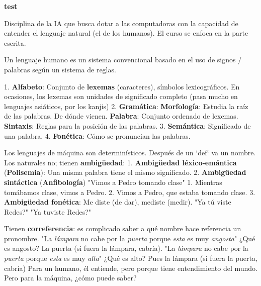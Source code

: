 \documentclass{fmbnotes}
\begin{document}
\newcommand*{\titulo}{test}
\portada{\titulo} 

\begin{center}
    {\Large\bfseries\sffamily \titulo}
\end{center}

Disciplina de la IA que busca dotar a las computadoras con la capacidad de entender el lenguaje natural (el de los humanos).
El curso se enfoca en la parte escrita.

\label{sec:introduccion_al_procesamiento_de_lenguaje_natural}

\label{sec:que_es_un_lenguaje_natural_}

Un lenguaje humano es un sistema convencional basado en el uso de signos / palabras según un sistema de reglas. 

\label{sec:elementos_de_un_lenguaje}
1. \textbf{Alfabeto}: Conjunto de \textbf{lexemas} (caracteres), símbolos lexicográficos.
		En ocasiones, los lexemas son unidades de significado completo (pasa mucho en lenguajes asiáticos, por los kanjis)
2. \textbf{Gramática}:
	\textbf{Morfología}: Estudia la raíz de las palabras. De dónde vienen. 
		\textbf{Palabra}: Conjunto ordenado de lexemas.
	\textbf{Sintaxis}: Reglas para la posición de las palabras.
3. \textbf{Semántica}: Significado de una palabra.
4. \textbf{Fonética}: Cómo se pronuncian las palabras.

\label{sec:_por_que_es_dificil_entender_el_lenguaje_natural_}
Los lenguajes de máquina son determinísticos. Después de un `def` va un nombre.
Los naturales no; tienen \textbf{ambigüedad}:
1. \textbf{Ambigüedad léxico-emántica} (\textbf{Polisemia}): Una misma palabra tiene el mismo significado.
2. \textbf{Ambigüedad sintáctica} (\textbf{Anfibología})
	"Vimos a Pedro tomando clase"
	1. Mientras tomábamos clase, vimos a Pedro.
	2. Vimos a Pedro, que estaba tomando clase.
3. \textbf{Ambigüedad fonética}: Me diste (de dar), mediste (medir).
	"Ya tú viste Redes?"
	"Ya tuviste Redes?"

Tienen \textbf{correferencia}: es complicado saber a qué nombre hace referencia un pronombre.
"La \textit{lámpara} no cabe por la \textit{puerta} porque \textit{esta} es muy \textit{angosta}" ¿Qué es angosto? La puerta (si fuera la lámpara, cabría).
"La \textit{lámpara} no cabe por la \textit{puerta} porque \textit{esta} es muy \textit{alta}" ¿Qué es alto? Pues la lámpara (si fuera la puerta, cabría)
Para un humano, él entiende, pero porque tiene entendimiento del mundo.
Pero para la máquina, ¿cómo puede saber?
\end{document}
